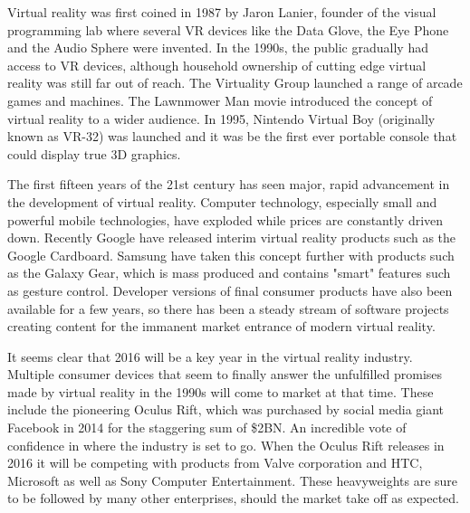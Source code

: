 \documentclass[preprint,12pt]{elsarticle}
\begin{document}
Virtual reality was first coined in 1987 by Jaron Lanier, founder of the visual programming lab where several VR devices like the Data Glove, the Eye Phone and the Audio Sphere were invented. In the 1990s, the public gradually had access to VR devices, although household ownership of cutting edge virtual reality was still far out of reach. The Virtuality Group launched a range of arcade games and machines. The Lawnmower Man movie introduced the concept of virtual reality to a wider audience. In 1995, Nintendo Virtual Boy (originally known as VR-32) was launched and it was be the first ever portable console that could display true 3D graphics.


The first fifteen years of the 21st century has seen major, rapid advancement in the development of virtual reality. Computer technology, especially small and powerful mobile technologies, have exploded while prices are constantly driven down. Recently Google have released interim virtual reality products such as the Google Cardboard. Samsung have taken this concept further with products such as the Galaxy Gear, which is mass produced and contains "smart" features such as gesture control. Developer versions of final consumer products have also been available for a few years, so there has been a steady stream of software projects creating content for the immanent market entrance of modern virtual reality.


It seems clear that 2016 will be a key year in the virtual reality industry. Multiple consumer devices that seem to finally answer the unfulfilled promises made by virtual reality in the 1990s will come to market at that time. These include the pioneering Oculus Rift, which was purchased by social media giant Facebook in 2014 for the staggering sum of \$2BN. An incredible vote of confidence in where the industry is set to go. When the Oculus Rift releases in 2016 it will be competing with products from Valve corporation and HTC, Microsoft as well as Sony Computer Entertainment. These heavyweights are sure to be followed by many other enterprises, should the market take off as expected.
\end{document}
